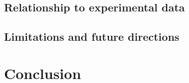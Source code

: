 \documentclass[10pt,letterpaper]{article}
\theoremstyle{plain}
\theoremstyle{remark}
\begin{document}
\subsection{Relationship to experimental data}


\subsection{Limitations and future directions}


\section{Conclusion}

\end{document}
